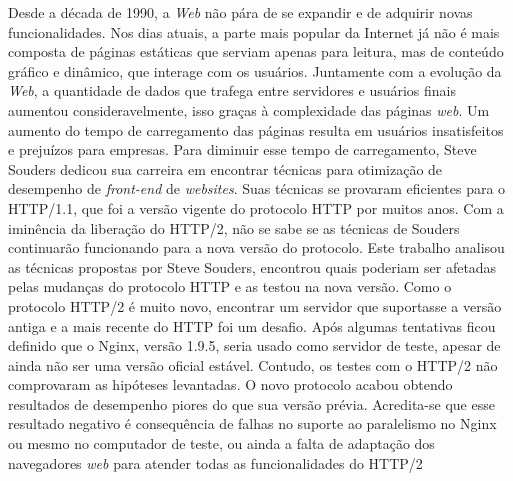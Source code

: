 %
%

\begin{resumo}

Desde a década de 1990, a \textit{Web} não pára de se expandir e de adquirir novas funcionalidades. Nos dias atuais, a parte mais popular da Internet já não é mais composta de páginas estáticas que serviam apenas para leitura, mas de conteúdo gráfico e dinâmico, que interage com os usuários. Juntamente com a evolução da \textit{Web}, a quantidade de dados que trafega entre servidores e usuários finais aumentou consideravelmente, isso graças à complexidade das páginas \textit{web}. Um aumento do tempo de carregamento das páginas resulta em usuários insatisfeitos e prejuízos para empresas. Para diminuir esse tempo de carregamento, Steve Souders dedicou sua carreira em encontrar técnicas para otimização de desempenho de \textit{front-end} de \textit{websites}. Suas técnicas se provaram eficientes para o HTTP/1.1, que foi a versão vigente do protocolo HTTP por muitos anos. Com a iminência da liberação do HTTP/2, não se sabe se as técnicas de Souders continuarão funcionando para a nova versão do protocolo. Este trabalho analisou as técnicas propostas por Steve Souders, encontrou quais poderiam ser afetadas pelas mudanças do protocolo HTTP e as testou na nova versão. Como o protocolo HTTP/2 é muito novo, encontrar um servidor que suportasse a versão antiga e a mais recente do HTTP foi um desafio. Após algumas tentativas ficou definido que o Nginx, versão 1.9.5, seria usado como servidor de teste, apesar de ainda não ser uma versão oficial estável. Contudo, os testes com o HTTP/2 não comprovaram as hipóteses levantadas. O novo protocolo acabou obtendo resultados de desempenho piores do que sua versão prévia. Acredita-se que esse resultado negativo é consequência de falhas no suporte ao paralelismo no Nginx ou mesmo no computador de teste, ou ainda a falta de adaptação dos navegadores \textit{web} para atender todas as funcionalidades do HTTP/2

\end{resumo}